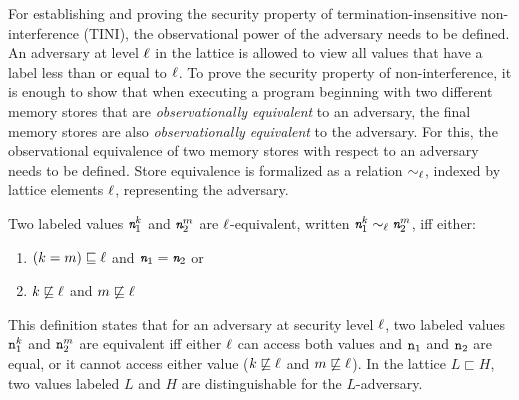 

For establishing and proving the security
property of termination-insensitive non-interference (TINI), the
observational power of the adversary needs to be defined. 
An adversary at level $\ell$ in the lattice is allowed to view
all values that have a label less than or equal to $\ell$. To prove
the security property of non-interference, it is enough to show that
when executing a program beginning with two different memory stores
that are \emph{observationally equivalent} to an adversary, the final
memory stores are also \emph{observationally equivalent} to the
adversary. For this, the observational equivalence of two memory
stores with respect to an adversary needs to be defined. 
Store equivalence is formalized as a relation $\sim_\ell$,
indexed by lattice elements $\ell$, representing the adversary.

\begin{mydef}
  Two labeled values $\emph{\texttt{n}}_1^k$ and $\emph{\texttt{n}}_2^m$ are $\ell$-equivalent,
  written $\emph{\texttt{n}}_1^k \sim_\ell \emph{\texttt{n}}_2^m$, iff either:
  \begin{enumerate}
  \item $(k = m) \sqsubseteq \ell$ and $\emph{\texttt{n}}_1 = \emph{\texttt{n}}_2$ or
  \item $k \not\sqsubseteq \ell$ and $m \not\sqsubseteq \ell$
  \end{enumerate}
\end{mydef}

This definition states that for an adversary at security level $\ell$,
two labeled values $\texttt{n}_1^k$ and $\texttt{n}_2^m$ are equivalent iff either
$\ell$ can access both values and $\texttt{n}_1$ and $\texttt{n}_2$ are equal, or it
cannot access either value ($k \not\sqsubseteq \ell$ and $m
\not\sqsubseteq \ell$).
In the lattice
$L \sqsubset H$, two values labeled $L$ and $H$ are distinguishable
for the $L$-adversary. 

